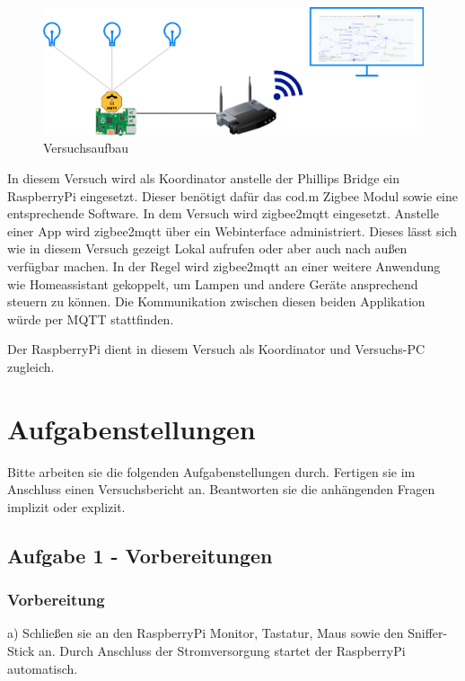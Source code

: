 \begin{figure}[H]
    \centering
    \includegraphics[width=1\textwidth]{media/zbz2m.png}
    \caption{Versuchsaufbau}
\end{figure}

In diesem Versuch wird als Koordinator anstelle der Phillips Bridge ein RaspberryPi eingesetzt. Dieser benötigt dafür das cod.m Zigbee Modul sowie eine entsprechende
Software. In dem Versuch wird zigbee2mqtt eingesetzt. Anstelle einer App wird zigbee2mqtt über ein Webinterface administriert. Dieses lässt sich wie in diesem Versuch gezeigt Lokal 
aufrufen oder aber auch nach außen verfügbar machen. In der Regel wird zigbee2mqtt an einer weitere Anwendung wie Homeassistant gekoppelt, um Lampen und andere Geräte 
ansprechend steuern zu können. Die Kommunikation zwischen diesen beiden Applikation würde per MQTT stattfinden.

Der RaspberryPi dient in diesem Versuch als Koordinator und Versuchs-PC zugleich. 



\section{Aufgabenstellungen}

Bitte arbeiten sie die folgenden Aufgabenstellungen durch. Fertigen sie im Anschluss einen Versuchsbericht an. Beantworten sie die anhängenden Fragen
implizit oder explizit.

\subsection{Aufgabe 1 - Vorbereitungen}

\subsubsection{Vorbereitung}
a) Schließen sie an den RaspberryPi Monitor, Tastatur, Maus sowie den Sniffer-Stick an. Durch Anschluss der
Stromversorgung startet der RaspberryPi automatisch. 

